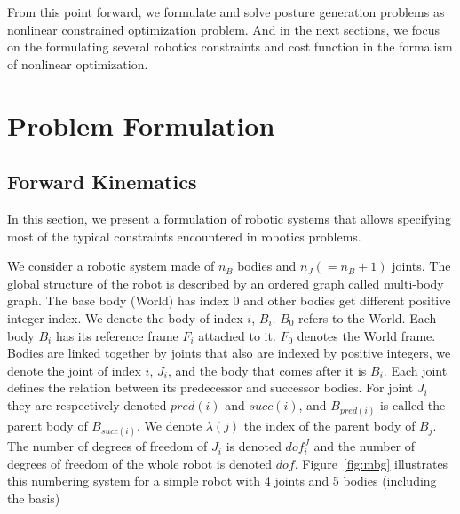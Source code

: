 From this point forward, we formulate and solve posture generation problems as nonlinear constrained optimization problem.
And in the next sections, we focus on the formulating several robotics constraints and cost function in the formalism of nonlinear optimization.



\section{Problem Formulation}
\label{sec:pg_formulation}


\subsection{Forward Kinematics}
\label{sub:forward_kinematics}


In this section, we present a formulation of robotic systems that allows specifying most of the typical constraints encountered in robotics problems.

We consider a robotic system made of $n_B$ bodies and $n_J(=n_B+1)$ joints.
The global structure of the robot is described by an ordered graph called multi-body graph.
The base body (World) has index $0$ and other bodies get different positive integer index.
We denote the body of index $i$, $B_i$.
$B_0$ refers to the World.
Each body $B_i$ has its reference frame $F_i$ attached to it.
$F_0$ denotes the World frame.
Bodies are linked together by joints that also are indexed by positive integers, we denote the joint of index $i$, $J_i$, and the body that comes after it is $B_i$.
Each joint defines the relation between its predecessor and successor bodies.
For joint $J_i$ they are respectively denoted $pred(i)$ and $succ(i)$, and $B_{pred(i)}$ is called the parent body of $B_{succ(i)}$.
We denote $\lambda(j)$ the index of the parent body of $B_j$.
The number of degrees of freedom of $J_i$ is denoted $dof^J_i$ and the number of degrees of freedom of the whole robot is denoted $dof$.
Figure~\ref{fig:mbg} illustrates this numbering system for a simple robot with 4 joints and 5 bodies (including the basis)

